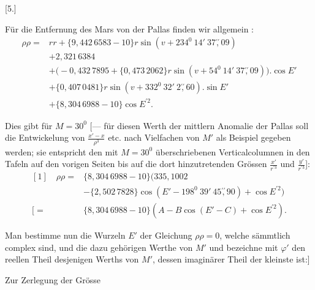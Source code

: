\clearpage
\begingroup
{}
\renewcommand{\headrulewidth}{0pt}
\par\medskip
{}
\begin{center}[5.]\end{center}
\begingroup
\small
\par\noindent\hspace*{\parindent}Für die Entfernung des Mars von der Pallas finden wir allgemein%
\HistoricalNoteEight{Die Zahlen in den Klammern \(\{\ \}\) sind Logarithmen.]}:
\[
\begin{aligned}
\rho\rho={}&rr+\{9{,}442\,6583-10\}r\sin(v+234^0\ 14'\ 37\overset{\prime\prime}{,}09)\\
&+2{,}321\,6384\\
&+\bigl(-0{,}432\,7895+\{0{,}473\,2062\}r\sin(v+54^0\ 14'\ 37\overset{\prime\prime}{,}09)\bigr)
  \mathord{.}\cos E'\\
&+\{0{,}407\,0481\}r\sin(v+332^0\ 32'\ 2\overset{\prime\prime}{,}60)
  \mathord{.}\sin E'\\
&+\{8{,}304\,6988-10\}\cos E^{\prime2}.
\end{aligned}
\]
\par\noindent\hspace*{\parindent}Dies gibt für \(M=30^0\) [--- für diesen Werth der mittlern Anomalie der
Pallas soll die Entwickelung von \(\frac{x'-x}{\rho^3}\) etc. nach Vielfachen von \(M'\) als
Beispiel gegeben werden; sie entspricht den mit \(M=30^0\) überschriebenen Verticalcolumnen
in den Tafeln auf den vorigen Seiten bis auf die dort hinzutretenden Grössen
\(\frac{x'}{r^{\prime3}}\) und \(\frac{y'}{r^{\prime3}}\)]:
\[
\begin{aligned}
{[1]}\quad\rho\rho={}&\{8{,}304\,6988-10\}\bigl(335{,}1002\\
&-\{2{,}502\,7828\}\cos(E'-198^0\ 39'\ 45\overset{\prime\prime}{,}90)+\cos E^{\prime2}\bigr)\\
{[}={}&\{8{,}304\,6988-10\}(A-B\cos(E'-C)+\cos E^{\prime2}).
\end{aligned}
\]
\par\noindent\hspace*{\parindent}Man bestimme nun die Wurzeln \(E'\) der Gleichung \(\rho\rho=0\), welche
sämmtlich complex sind, und die dazu gehörigen Werthe von \(M'\) und bezeichne
mit \(\varphi'\) den reellen Theil desjenigen Werths von \(M'\), dessen imaginärer Theil der kleinste ist:]
\par\noindent\hspace*{\parindent}Zur Zerlegung der Grösse
